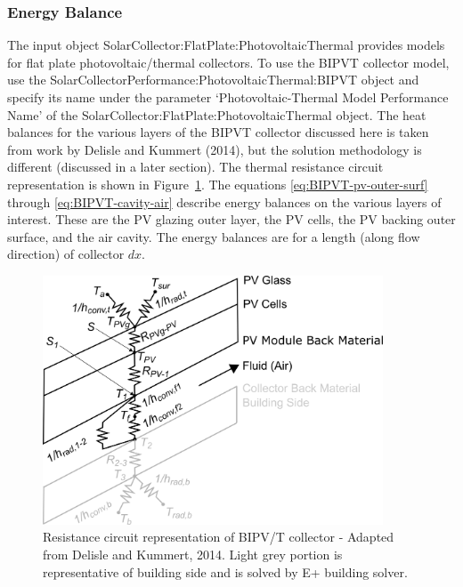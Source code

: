 \subsubsection{Energy Balance}\label{BIPVT-energy-balance}
The input object SolarCollector:FlatPlate:PhotovoltaicThermal provides models for flat plate photovoltaic/thermal collectors. To use the BIPVT collector model, use the SolarCollectorPerformance:PhotovoltaicThermal:BIPVT object and specify its name under the parameter `Photovoltaic-Thermal Model Performance Name' of the SolarCollector:FlatPlate:PhotovoltaicThermal object.
The heat balances for the various layers of the BIPVT collector discussed here is taken from work by Delisle and Kummert (2014), but the solution methodology is different (discussed in a later section). The thermal resistance circuit representation is shown in Figure~\ref{fig:BIPVT-resistance-circuit}.
The equations \ref{eq:BIPVT-pv-outer-surf} through \ref{eq:BIPVT-cavity-air} describe energy balances on the various layers of interest. These are the PV glazing outer layer, the PV cells, the PV backing outer surface, and the air cavity. The energy balances are for a length (along flow direction) of collector \(dx\). 


\begin{figure}[hbtp] %
\centering
\includegraphics[width=0.9\textwidth, height=0.9\textheight, keepaspectratio=true]{media/BIPVT.png}
\caption{Resistance circuit representation of BIPV/T collector - Adapted from Delisle and Kummert, 2014. Light grey portion is representative of building side and is solved by E+ building solver. \protect \label{fig:BIPVT-resistance-circuit}}
\end{figure}

